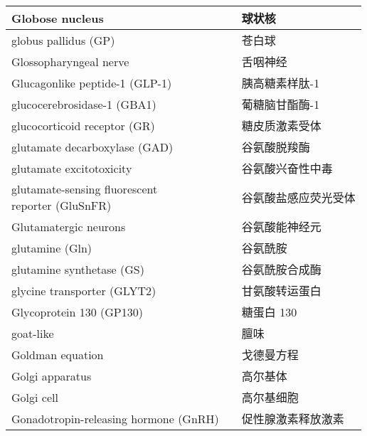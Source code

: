\begin{longtable}{lll}
	\midrule
	Globose nucleus     && 球状核  \\
	
	\midrule
	globus pallidus (GP)    && 苍白球  \\
	
	\midrule
	Glossopharyngeal nerve     && 舌咽神经  \\
	
	\midrule
	Glucagonlike peptide-1 (GLP-1)    &&  胰高糖素样肽-1  \\
	
	\midrule
	glucocerebrosidase-1 (GBA1)     &&  葡糖脑甘酯酶-1  \\
	
	\midrule
	glucocorticoid receptor (GR)    &&  糖皮质激素受体  \\
	
	\midrule
	glutamate decarboxylase (GAD)    &&  谷氨酸脱羧酶  \\
	
	\midrule
	glutamate excitotoxicity     &&  谷氨酸兴奋性中毒  \\
	
	\midrule
	\makecell[l]{glutamate-sensing fluorescent \\ reporter (GluSnFR) }   &&  谷氨酸盐感应荧光受体  \\
	
	\midrule
	Glutamatergic neurons     &&  谷氨酸能神经元  \\
	
	\midrule
	glutamine (Gln)  &&  谷氨酰胺  \\
	
	\midrule
	glutamine synthetase  (GS)   &&  谷氨酰胺合成酶  \\
	
	\midrule
	glycine transporter (GLYT2)   &&  甘氨酸转运蛋白  \\
	
	\midrule
	Glycoprotein 130 (GP130)    &&  糖蛋白 130  \\
	
	\midrule
	goat-like     &&  	膻味  \\
	
	\midrule
	Goldman equation     &&  	戈德曼方程  \\
	
	\midrule
	Golgi apparatus     &&  	高尔基体  \\
	
	\midrule
	Golgi cell     &&  	高尔基细胞  \\
	
	\midrule
	Gonadotropin-releasing hormone (GnRH)    &&  	促性腺激素释放激素  \\
	

\end{longtable}
